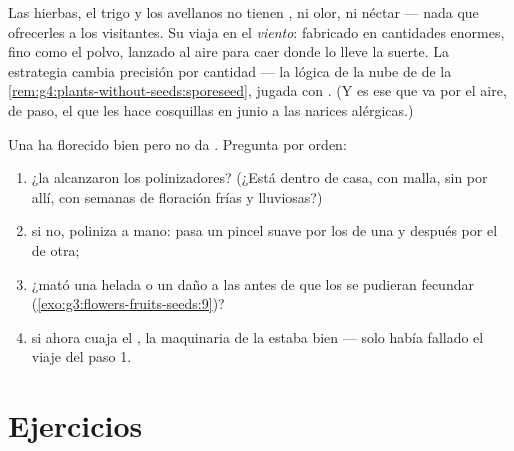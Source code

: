 \begin{example}\label{ex:g5:flower-to-fruit:wind}
Las hierbas, el trigo y los avellanos no tienen , ni olor, ni
néctar --- nada que ofrecerles a los visitantes. Su  viaja en el
\emph{viento}: fabricado en cantidades enormes, fino como el polvo,
lanzado al aire para caer donde lo lleve la suerte. La estrategia
cambia precisión por cantidad --- la lógica de la nube de  de
la \cref{rem:g4:plants-without-seeds:sporeseed}, jugada con . (Y
es ese  que va por el aire, de paso, el que les hace cosquillas
en junio a las narices alérgicas.)
\end{example}

\begin{method}\label{met:g5:flower-to-fruit:diagnose}
Una  ha florecido bien pero no da . Pregunta por orden:
\begin{enumerate}
  \item ¿la alcanzaron los polinizadores? (¿Está dentro de casa, con
        malla, sin  por allí, con semanas de floración frías y
        lluviosas?)
  \item si no, poliniza a mano: pasa un pincel suave por los 
        de una  y después por el  de otra;
  \item ¿mató una helada o un daño a las  antes de que los
         se pudieran fecundar
        (\cref{exo:g3:flowers-fruits-seeds:9})?
  \item si ahora cuaja el , la maquinaria de la  estaba
        bien --- solo había fallado el viaje del paso 1.
\end{enumerate}
\end{method}

\section{Ejercicios}

